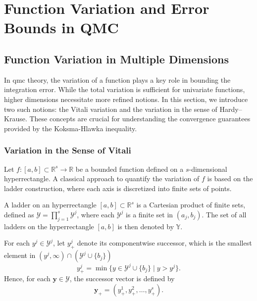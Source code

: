 \chapter{Function Variation and Error Bounds in QMC}
\label{chapter3}

\section{Function Variation in Multiple Dimensions}

In \ac{qmc} theory, the variation of a function plays a key role in bounding the
integration error. While the total variation is sufficient for univariate
functions, higher dimensions necessitate more refined notions. In this section,
we introduce two such notions: the Vitali variation and the variation in the
sense of Hardy--Krause. These concepts are crucial for understanding the
convergence guarantees provided by the Koksma-Hlawka inequality.


\subsection{Variation in the Sense of Vitali}
\label{sec:vitali-variation}

Let $f \colon [a,b] \subset \mathbb{R}^s \to \mathbb{R}$ be a bounded function
defined on a $s$-dimensional hyperrectangle. A classical approach to quantify
the variation of $f$ is based on the ladder construction, where each axis is
discretized into finite sets of points.

A ladder on an hyperrectangle $[a,b] \subset \mathbb{R}^s$ is a Cartesian
product of finite sets, defined as $\mathcal{Y} = \prod_{j=1}^s \mathcal{Y}^j$,
where each $\mathcal{Y}^j$ is a finite set in $(a_j, b_j)$. The set of all
ladders on the hyperrectangle $[a,b]$ is then denoted by $\mathbb{Y}$.

For each $y^j \in \mathcal{Y}^j$, let $y^j_+$ denote its componentwise
successor, which is the smallest element in $(y^j,\infty)\cap (\mathcal{Y}^j
\cup \{b_j\})$
\begin{equation*}
    y^j_+ = \min\{y \in \mathcal{Y}^j \cup \{b_j\} \mid y > y^j\}.
\end{equation*}
Hence, for each $\mathbf{y} \in \mathcal{Y}$, the successor vector is defined by
\begin{equation*}
    \mathbf{y}_+ = (y^1_+, y^2_+, \ldots, y^s_+).
\end{equation*}

